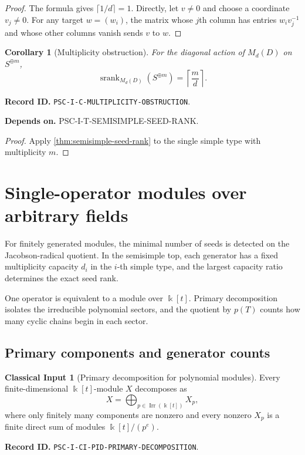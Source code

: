 \documentclass[11pt]{article}
\newtheorem{corollary}[corollary]{Corollary}
\theoremstyle{definition}
\newtheorem{classicalinput}[classicalinput]{Classical Input}
\theoremstyle{remark}
\newcommand{\bbk}{\Bbbk}
\newcommand{\srank}{\operatorname{srank}}
\newcommand{\Irr}{\operatorname{Irr}}
\newcommand{\RecordID}[1]{\par\smallskip\noindent\begingroup\footnotesize\color{PSCGray}\raggedright\textbf{Record ID.} \nolinkurl{#1}.\par\endgroup}
\newcommand{\Depends}[1]{\par\noindent\begingroup\footnotesize\color{PSCGray}\raggedright\textbf{Depends on.} #1\par\endgroup}
\begin{document}
\begin{proof}
The formula gives $\lceil1/d\rceil=1$.  Directly, let $v\neq0$ and choose a coordinate $v_j\neq0$.  For any target $w=(w_i)$, the matrix whose $j$th column has entries $w_iv_j^{-1}$ and whose other columns vanish sends $v$ to $w$.
\end{proof}

\begin{corollary}[Multiplicity obstruction]
\label{cor:multiplicity-obstruction}
For the diagonal action of $M_d(D)$ on $S^{\oplus m}$,
\[
\boxed{
\srank_{M_d(D)}(S^{\oplus m})
=
\left\lceil\frac{m}{d}\right\rceil.
}
\]
\end{corollary}
\RecordID{PSC-I-C-MULTIPLICITY-OBSTRUCTION}
\Depends{PSC-I-T-SEMISIMPLE-SEED-RANK.}

\begin{proof}
Apply \cref{thm:semisimple-seed-rank} to the single simple type with multiplicity $m$.
\end{proof}

\section{Single-operator modules over arbitrary fields}

\begin{sectionrecap}
For finitely generated modules, the minimal number of seeds is detected on the Jacobson-radical quotient.  In the semisimple top, each generator has a fixed multiplicity capacity \(d_i\) in the \(i\)-th simple type, and the largest capacity ratio determines the exact seed rank.
\end{sectionrecap}

\begin{readerroadmap}
One operator is equivalent to a module over \(\bbk[t]\).  Primary decomposition isolates the irreducible polynomial sectors, and the quotient by \(p(T)\) counts how many cyclic chains begin in each sector.
\end{readerroadmap}
\subsection{Primary components and generator counts}

\begin{classicalinput}[Primary decomposition for polynomial modules]
\label{ci:primary-decomposition}
Every finite-dimensional $\bbk[t]$-module $X$ decomposes as
\[
X=\bigoplus_{p\in\Irr(\bbk[t])}X_p,
\]
where only finitely many components are nonzero and every nonzero $X_p$ is a finite direct sum of modules $\bbk[t]/(p^e)$.
\end{classicalinput}
\RecordID{PSC-I-CI-PID-PRIMARY-DECOMPOSITION}
\end{document}
